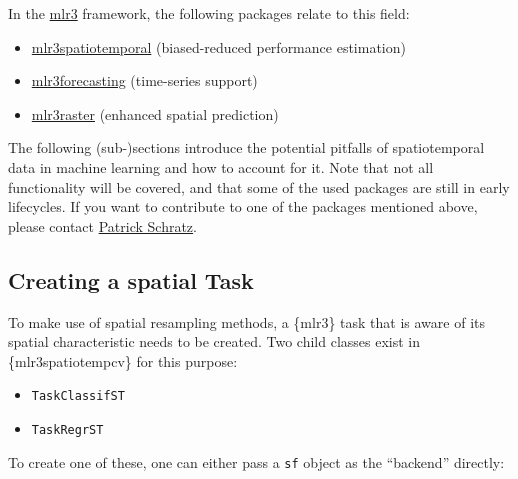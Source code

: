 \documentclass[
]{scrbook}
\newenvironment{Shaded}{\begin{snugshade}}{\end{snugshade}}
\newcommand{\AttributeTok}[1]{\textcolor[rgb]{0.77,0.63,0.00}{#1}}
\newcommand{\CommentTok}[1]{\textcolor[rgb]{0.56,0.35,0.01}{\textit{#1}}}
\newcommand{\DecValTok}[1]{\textcolor[rgb]{0.00,0.00,0.81}{#1}}
\newcommand{\FunctionTok}[1]{\textcolor[rgb]{0.00,0.00,0.00}{#1}}
\newcommand{\NormalTok}[1]{#1}
\newcommand{\OtherTok}[1]{\textcolor[rgb]{0.56,0.35,0.01}{#1}}
\newcommand{\SpecialCharTok}[1]{\textcolor[rgb]{0.00,0.00,0.00}{#1}}
\newcommand{\StringTok}[1]{\textcolor[rgb]{0.31,0.60,0.02}{#1}}
\providecommand{\tightlist}{%
  \setlength{\itemsep}{0pt}\setlength{\parskip}{0pt}}
\renewenvironment{Shaded} {\begin{snugshade}\small} {\end{snugshade}}
\begin{document}
In the \href{https://cran.r-project.org/package=mlr3}{mlr3} framework, the following packages relate to this field:

\begin{itemize}
\tightlist
\item
  \href{https://github.com/mlr-org/mlr3spatiotemporal}{mlr3spatiotemporal} (biased-reduced performance estimation)
\item
  \href{https://github.com/mlr-org/mlr3forecasting}{mlr3forecasting} (time-series support)
\item
  \href{https://github.com/mlr-org/mlr3raster}{mlr3raster} (enhanced spatial prediction)
\end{itemize}

The following (sub-)sections introduce the potential pitfalls of spatiotemporal data in machine learning and how to account for it.
Note that not all functionality will be covered, and that some of the used packages are still in early lifecycles.
If you want to contribute to one of the packages mentioned above, please contact \href{https://github.com/pat-s}{Patrick Schratz}.

\hypertarget{creating-a-spatial-task}{%
\subsection{Creating a spatial Task}\label{creating-a-spatial-task}}

To make use of spatial resampling methods, a \{mlr3\} task that is aware of its spatial characteristic needs to be created.
Two child classes exist in \{mlr3spatiotempcv\} for this purpose:

\begin{itemize}
\tightlist
\item
  \texttt{TaskClassifST}
\item
  \texttt{TaskRegrST}
\end{itemize}

To create one of these, one can either pass a \texttt{sf} object as the ``backend'' directly:

\begin{Shaded}
\end{Shaded}
\end{document}
